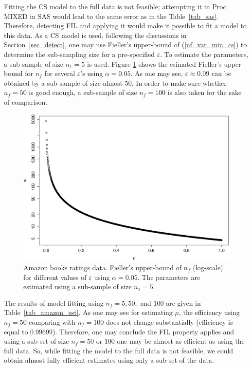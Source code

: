 \documentclass[11pt,a5paper,twoside]{book}
\begin{document}
Fitting the CS model to the full data is not feasible; attempting it in Proc MIXED in SAS would lead to the same error as in the Table~\ref{tab_sas}. Therefore, detecting FIL and applying it would make it possible to fit a model to this data. As a CS model is used, following the discussions in Section~\ref{sec_detect}, one may use Fieller's upper-bound of (\ref{nf_var_min_cs}) to determine the sub-sampling size for a pre-specified $\varepsilon$. To estimate the parameters, a sub-sample of size $n_1=5$ is used. Figure \ref{fig_nf} shows the esimated Fieller's upper-bound for $n_f$ for several $\varepsilon$'s using $\alpha=0.05$. As one may see, $\varepsilon \approx 0.09$ can be obtained by a sub-sample of size almost $50$. In order to make sure whether $n_f=50$ is good enough, a sub-sample of size $n_f=100$ is also taken for the sake of comparison.




\begin{figure}[!t]
\centering
\includegraphics[width=\textwidth]{fig_nf_epsilon_full.eps}
\caption{Amazon books ratings data. Fieller's upper-bound of $n_f$ (log-scale) for different values of $\varepsilon$ using $\alpha=0.05$. The parameters are estimated using a sub-sample of size $n_1=5$.} 
\label{fig_nf}
\end{figure}  

The results of model fitting using $n_f=5,50,$ and $100$ are given in Table~\ref{tab_amazon_est}. As one may see for estimating $\mu$, the efficiency using $n_f=50$ comparing with $n_f=100$ does not change substantially (efficiency is equal to $0.99699$). Therefore, one may conclude the FIL property applies and using a sub-set of size $n_f=50$ or $100$ one may be almost as efficient as using the full data. So, while fitting the model to the full data is not feasible, we could obtain almost fully efficient estimates using only a sub-set of the data.
\end{document}
